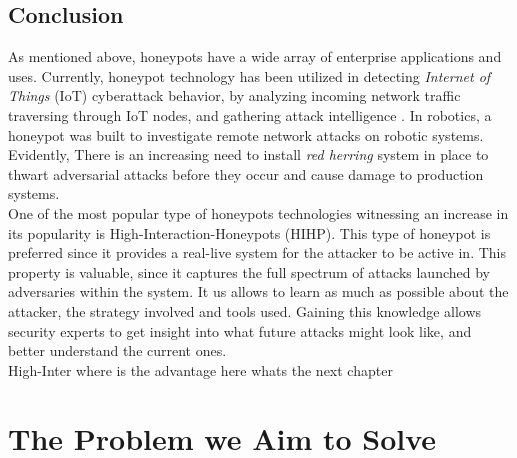 \documentclass[grad,lot,lof,11pt,oneside,onehalfspace]{RUthesis}
\begin{document}
\subsection{Conclusion}
As mentioned above, honeypots have a wide array of enterprise applications and uses. Currently, honeypot technology has been utilized in detecting \textit{Internet of Things} (IoT) cyberattack behavior, by analyzing incoming network traffic  traversing through IoT nodes, and gathering attack intelligence \cite{dowling_zigbee_2017}. In robotics, a honeypot was built to investigate remote network attacks on robotic systems\cite{irvene_honeybot:_2017}. Evidently, There is an increasing need to install \textit{red herring} system in place to thwart adversarial attacks before they occur and cause damage to production systems.   \\
One of the most popular type of honeypots technologies witnessing an increase in its popularity is High-Interaction-Honeypots (HIHP).  This type of honeypot is preferred since it provides a real-live system for the attacker to be active in. This property is valuable, since it captures the full spectrum of attacks launched by adversaries within the system. It us allows to learn as much as possible about the attacker, the strategy involved and tools used. Gaining this knowledge allows security experts to get insight into what future attacks might look like, and better understand the current ones. \\
High-Inter
where is the advantage here
whats the next chapter
\section{The Problem we Aim to Solve}

\end{document}
